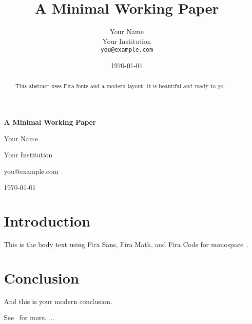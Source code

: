 \documentclass[12pt,a4paper]{article}
\title{A Minimal Working Paper}
\author{Your Name \\
Your Institution \\
\texttt{you@example.com}
}
\date{\today}
\begin{document}
\begin{titlepage}
  \centering
  \vspace*{4cm}
  {\Huge \bfseries A Minimal Working Paper \par}
  \vspace{2cm}
  {\Large Your Name\par}
  \vspace{0.5cm}
  {\large Your Institution\par}
  \vspace{0.5cm}
  {\ttfamily you@example.com\par}
  \vfill
  {\large \today\par}
\end{titlepage}

\begin{abstract}
This abstract uses Fira fonts and a modern layout. It is beautiful and ready to go.
\end{abstract}

\twocolumn

\section{Introduction}

This is the body text using Fira Sans, Fira Math, and Fira Code for monospace~\cite{silva2020}.

\section{Conclusion}

And this is your modern conclusion.

See~\cite{silva2020} for more.
...
\printbibliography
\end{document}
